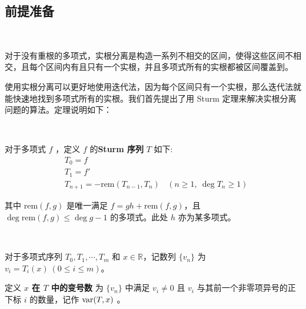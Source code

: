 \subsection{前提准备}

\begin{problem}[实根分离]~
	
	对于没有重根的多项式，实根分离是构造一系列不相交的区间，使得这些区间不相交，且每个区间内有且只有一个实根，并且多项式所有的实根都被区间覆盖到。
	
	
\end{problem}

使用实根分离可以更好地使用迭代法，因为每个区间只有一个实根，那么迭代法就能快速地找到多项式所有的实根。我们首先提出了用 Sturm 定理来解决实根分离问题的算法。定理说明如下：

\begin{definition}[Sturm 序列]~
	
	对于多项式 $f$ ，定义 $f$ 的\textbf{Sturm 序列} $T$ 如下:
	$$
	\begin{aligned}
		& T_0 = f \\
		& T_1 = f' \\
		& T_{n + 1} = -\textrm{rem}(T_{n - 1}, T_n) \ \ \ \ (n \ge 1, \ \deg {T_n} \ge 1)
	\end{aligned}
	$$
	
	其中 $\textrm{rem}(f, g)$ 是唯一满足 $f = gh + \textrm{rem}(f, g)$，且 $\deg \textrm{rem}(f, g) \le \deg g - 1$ 的多项式。此处 $h$ 亦为某多项式。
	
	
\end{definition}

\begin{definition}[实数在多项式序列中的变号数]~
	
	对于多项式序列 $T_0, T_1, \cdots, T_m$ 和 $x \in \mathbb{R}$，记数列 $\{v_n\}$ 为 $v_i = T_i(x) \ (0 \le i \le m)$。
	
	定义\textbf{ $x$ 在 $T$ 中的变号数} 为 $\{v_n\}$ 中满足 $v_i \neq 0$ 且 $v_i$ 与其前一个非零项异号的正下标 $i$ 的数量，记作 $\mathrm{var}(T, x)$ 。
	
	
\end{definition}

